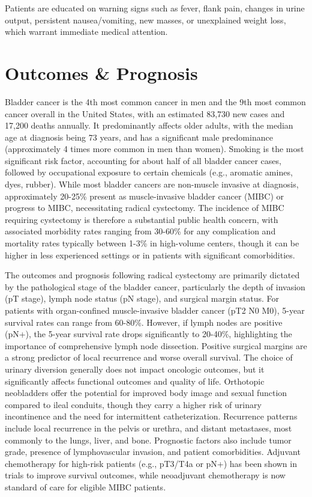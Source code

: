 Patients are educated on warning signs such as fever, flank pain, changes in urine output, persistent nausea/vomiting, new masses, or unexplained weight loss, which warrant immediate medical attention.

\section*{Outcomes \& Prognosis}
Bladder cancer is the 4th most common cancer in men and the 9th most common cancer overall in the United States, with an estimated 83,730 new cases and 17,200 deaths annually. It predominantly affects older adults, with the median age at diagnosis being 73 years, and has a significant male predominance (approximately 4 times more common in men than women). Smoking is the most significant risk factor, accounting for about half of all bladder cancer cases, followed by occupational exposure to certain chemicals (e.g., aromatic amines, dyes, rubber). While most bladder cancers are non-muscle invasive at diagnosis, approximately 20-25\% present as muscle-invasive bladder cancer (MIBC) or progress to MIBC, necessitating radical cystectomy. The incidence of MIBC requiring cystectomy is therefore a substantial public health concern, with associated morbidity rates ranging from 30-60\% for any complication and mortality rates typically between 1-3\% in high-volume centers, though it can be higher in less experienced settings or in patients with significant comorbidities.

The outcomes and prognosis following radical cystectomy are primarily dictated by the pathological stage of the bladder cancer, particularly the depth of invasion (pT stage), lymph node status (pN stage), and surgical margin status. For patients with organ-confined muscle-invasive bladder cancer (pT2 N0 M0), 5-year survival rates can range from 60-80\%. However, if lymph nodes are positive (pN+), the 5-year survival rate drops significantly to 20-40\%, highlighting the importance of comprehensive lymph node dissection. Positive surgical margins are a strong predictor of local recurrence and worse overall survival. The choice of urinary diversion generally does not impact oncologic outcomes, but it significantly affects functional outcomes and quality of life. Orthotopic neobladders offer the potential for improved body image and sexual function compared to ileal conduits, though they carry a higher risk of urinary incontinence and the need for intermittent catheterization. Recurrence patterns include local recurrence in the pelvis or urethra, and distant metastases, most commonly to the lungs, liver, and bone. Prognostic factors also include tumor grade, presence of lymphovascular invasion, and patient comorbidities. Adjuvant chemotherapy for high-risk patients (e.g., pT3/T4a or pN+) has been shown in trials to improve survival outcomes, while neoadjuvant chemotherapy is now standard of care for eligible MIBC patients.

